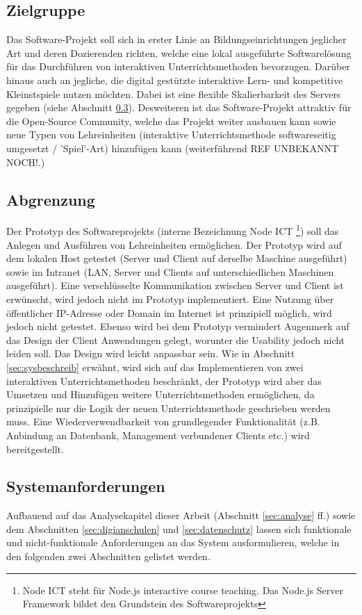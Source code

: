 \subsection{Zielgruppe}\label{sec:zielgruppe}
Das Software-Projekt soll sich in erster Linie an Bildungseinrichtungen jeglicher Art und deren Dozierenden richten, welche eine lokal ausgeführte Softwarelösung für das Durchführen von interaktiven Unterrichtsmethoden bevorzugen. Darüber hinaus auch an jegliche, die digital gestützte interaktive Lern- und kompetitive Kleinstspiele nutzen möchten. Dabei ist eine flexible Skalierbarkeit des Servers gegeben (siehe Abschnitt \ref{sec:anforderung}). Desweiteren ist das Software-Projekt attraktiv für die Open-Source Community, welche das Projekt weiter ausbauen kann sowie neue Typen von Lehreinheiten (interaktive Unterrichtsmethode softwareseitig umgesetzt / 'Spiel'-Art) hinzufügen kann (weiterführend REF UNBEKANNT NOCH!.) 
\subsection{Abgrenzung}\label{sec:abgrenz}
Der Prototyp des Softwareprojekts (interne Bezeichnung Node ICT \footnote{Node ICT steht für Node.js interactive course teaching. Das Node.js Server Framework bildet den Grundstein des Softwareprojekts}) soll das Anlegen und Ausführen von Lehreinheiten ermöglichen. Der Prototyp wird auf dem lokalen Host getestet (Server und Client auf derselbe Maschine ausgeführt) sowie im Intranet (LAN, Server und Clients auf unterschiedlichen Maschinen ausgeführt). Eine verschlüsselte Kommunikation zwischen Server und Client ist erwünscht, wird jedoch nicht im Prototyp implementiert. Eine Nutzung über öffentlicher IP-Adresse oder Domain im Internet ist prinzipiell möglich, wird jedoch nicht getestet. Ebenso wird bei dem Prototyp vermindert Augenmerk auf das Design der Client Anwendungen gelegt, worunter die Usability jedoch nicht leiden soll. Das Design wird leicht anpassbar sein. Wie in Abschnitt \ref{sec:sysbeschreib} erwähnt, wird sich auf das Implementieren von zwei interaktiven Unterrichtsmethoden beschränkt, der Prototyp wird aber das Umsetzen und Hinzufügen weitere Unterrichtsmethoden ermöglichen, da prinzipielle nur die Logik der neuen Unterrichtsmethode geschrieben werden muss. Eine Wiederverwendbarkeit von grundlegender Funktionalität (z.B. Anbindung an Datenbank, Management verbundener Clients etc.) wird bereitgestellt.   
\subsection{Systemanforderungen}\label{sec:anforderung}
Aufbauend auf das Analysekapitel dieser Arbeit (Abschnitt \ref{sec:analyse} ff.) sowie dem Abschnitten \ref{sec:digianschulen} und \ref{sec:datenschutz} lassen sich funktionale und nicht-funktionale Anforderungen an das System ausformulieren, welche in den folgenden zwei Abschnitten gelistet werden.

